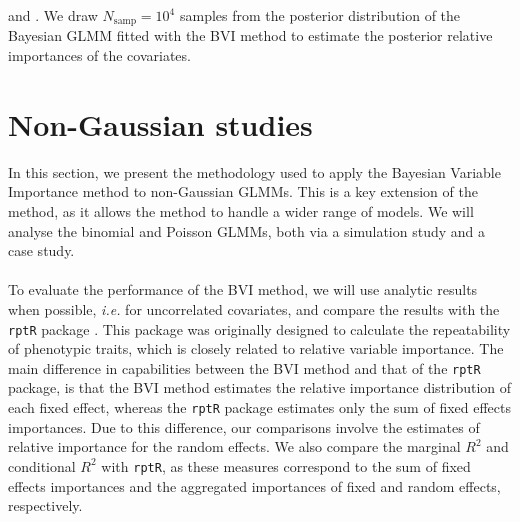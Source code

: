  and . We draw $N_{\text{samp}}=10^4$ samples from the posterior distribution of the Bayesian GLMM fitted with the BVI method to estimate the posterior relative importances of the covariates.

\section{Non-Gaussian studies}
In this section, we present the methodology used to apply the Bayesian Variable Importance method to non-Gaussian GLMMs. This is a key extension of the method, as it allows the method to handle a wider range of models. We will analyse the binomial and Poisson GLMMs, both via a simulation study and a case study.
\\
\\
To evaluate the performance of the BVI method, we will use analytic results when possible, \textit{i.e.} for uncorrelated covariates, and compare the results with the \texttt{rptR} package \citep{Stoffel2017rptR}. This package was originally designed to calculate the repeatability of phenotypic traits, which is closely related to relative variable importance. The main difference in capabilities between the BVI method and that of the \texttt{rptR} package, is that the BVI method estimates the relative importance distribution of each fixed effect, whereas the \texttt{rptR} package estimates only the sum of fixed effects importances. Due to this difference, our comparisons involve the estimates of relative importance for the random effects. We also compare the marginal $R^2$ and conditional $R^2$ with \texttt{rptR}, as these measures correspond to the sum of fixed effects importances and the aggregated importances of fixed and random effects, respectively.

